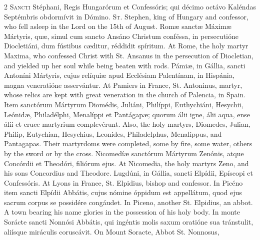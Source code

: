 \begin{paracol}{2}
\lettrine[lines=2]{S}{ancti} Stéphani, Regis 
 Hungarórum et Confessóris; qui décimo octávo Kaléndas Septémbris obdormívit 
 in Dómino.
\switchcolumn
{}
\lettrine[lines=2]{S}{t.} Stephen, king of Hungary and 
 confessor, who fell asleep in the Lord on the 15th of August.
\switchcolumn*
{}
Romæ sanctæ Máximæ 
 Mártyris, quæ, simul cum sancto Ansáno Christum conféssa, in persecutióne 
 Diocletiáni, dum fústibus cæditur, réddidit spíritum.
\switchcolumn
{}
At Rome, the holy martyr Maxima, who 
 confessed Christ with St. Ansanus in the persecution of Diocletian, and 
 yielded up her soul while being beaten with rods.
\switchcolumn*
{}
Pámiæ, in Gállia, 
 sancti Antoníni Mártyris, cujus relíquiæ apud Ecclésiam Palentínam, in 
 Hispánia, magna veneratióne asservántur.
\switchcolumn
{}
At Pamiers in France, St. Antoninus, 
 martyr, whose relics are kept with great veneration in the church of 
 Palencia, in Spain.
\switchcolumn*
{}
Item sanctórum Mártyrum 
 Diomédis, Juliáni, Philíppi, Euthychiáni, Hesychii, Leónidæ, Philadélphi, 
 Menalíppi et Pantágapæ; quorum álii igne, álii aqua, ense álii et cruce 
 martyrium complevérunt.
\switchcolumn
{}
Also, the holy martyrs, Diomedes, 
 Julian, Philip, Eutychian, Hesychius, Leonides, Philadelphus, Menalippus, 
 and Pantagapas. Their martyrdoms were completed, some by fire, some 
 water, others by the sword or by the cross.
\switchcolumn*
{}
Nicomedíæ sanctórum 
 Mártyrum Zenónis, atque Concórdii et Theodóri, filiórum ejus.
\switchcolumn
{}
At Nicomedia, the holy martyrs Zeno, 
 and his sons Concordius and Theodore.
\switchcolumn*
{}
Lugdúni, in Gállia, 
 sancti Elpídii, Epíscopi et Confessóris.
\switchcolumn
{}
At Lyons in France, St. Elpidius, 
 bishop and confessor.
\switchcolumn*
{}
In Picéno item sancti 
 Elpídii Abbátis, cujus nómine óppidum est appellátum, quod ejus sacrum 
 corpus se possidére congáudet.
\switchcolumn
{}
In Piceno, another St. Elpidius, an 
 abbot. A town bearing his name glories in the possession of his holy 
 body.
\switchcolumn*
{}
In monte Sorácte sancti 
 Nonnósi Abbátis, qui ingéntis molis saxum oratióne sua tránstulit, aliísque 
 miráculis coruscávit.
\switchcolumn
{}
On Mount Soracte, Abbot St. Nonnosus, 

\end{paracol}

